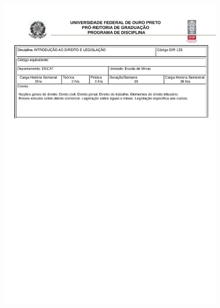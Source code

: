 \begin{figure}[p]
	\centering 
	\includegraphics[scale=0.7]{capitulos/anexo1-programas-disciplina/eg38.pdf}
\end{figure}

